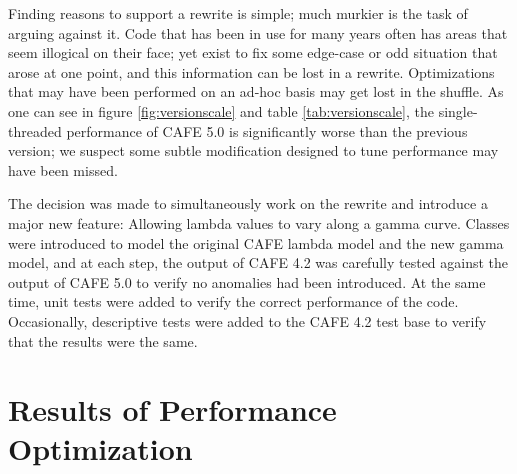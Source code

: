 \documentclass[acmtog, authorversion]{acmart}
\begin{document}
Finding reasons to support a rewrite is simple; much murkier is the task of arguing against it. Code that has been in use for many years often has areas that seem illogical on their face; yet exist to fix some edge-case or odd situation that arose at one point, and this information can be lost in a rewrite. Optimizations that may have been performed on an ad-hoc basis may get lost in the shuffle. As one can see in figure \ref{fig:versionscale} and table \ref{tab:versionscale}, the single-threaded performance of CAFE 5.0 is significantly worse than the previous version; we suspect some subtle modification designed to tune performance may have been missed.

The decision was made to simultaneously work on the rewrite and introduce a major new feature: Allowing lambda values to vary along a gamma curve. Classes were introduced to model the original CAFE lambda model and the new gamma model, and at each step, the output of CAFE 4.2 was carefully tested against the output of CAFE 5.0 to verify no anomalies had been introduced. At the same time, unit tests were added to verify the correct performance of the code. Occasionally, descriptive tests were added to the CAFE 4.2 test base to verify that the results were the same.
    
\section{Results of Performance Optimization} \label{sec:results}

    

\end{document}
